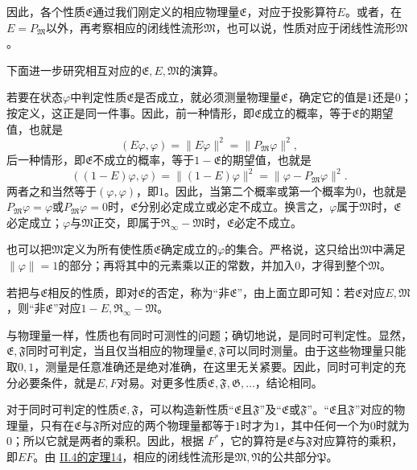 \documentclass[fontsize=13pt,twoside,openany,headings=normal,parskip=false,bookmarkpackage=false,DIV=calc]{scrbook}
\begin{document}
因此，各个性质$\mathfrak E$通过我们刚定义的相应物理量$\mathfrak E$，对应于投影算符$E$。或者，在$E=P_{\mathfrak M}$以外，再考察相应的闭线性流形$\mathfrak M$，也可以说，性质对应于闭线性流形$\mathfrak M$。

下面进一步研究相互对应的$\mathfrak E,\allowbreak E,\allowbreak \mathfrak M$的演算。

若要在状态$\varphi$中判定性质$\mathfrak E$是否成立，就必须测量物理量$\mathfrak E$，确定它的值是$1$还是$0$；按定义，这正是同一件事。因此，前一种情形，即$\mathfrak E$成立的概率，等于$\mathfrak E$的期望值，也就是
\[
(E\varphi,\varphi)=\|E\varphi\|^2=\|P_{\mathfrak M}\varphi\|^2,
\]
后一种情形，即$\mathfrak E$不成立的概率，等于$1-\mathfrak E$的期望值，也就是
\[
((1-E)\varphi,\varphi)=\|(1-E)\varphi\|^2=\|\varphi-P_{\mathfrak M}\varphi\|^2.
\]
两者之和当然等于$(\varphi,\allowbreak \varphi)$，即$1$。因此，当第二个概率或第一个概率为$0$，也就是$P_{\mathfrak M}\varphi=\varphi$或$P_{\mathfrak M}\varphi=0$时，$\mathfrak E$分别必定成立或必定不成立。换言之，$\varphi$属于$\mathfrak M$时，$\mathfrak E$必定成立；$\varphi$与$\mathfrak M$正交，即属于$\mathfrak R_\infty-\mathfrak M$时，$\mathfrak E$必定不成立。

也可以把$\mathfrak M$定义为所有使性质$\mathfrak E$确定成立的$\varphi$的集合。严格说，这只给出$\mathfrak M$中满足$\|\varphi\|=1$的部分；再将其中的元素乘以正的常数，并加入$0$，才得到整个$\mathfrak M$。

若把与$\mathfrak E$相反的性质，即对$\mathfrak E$的否定，称为“非$\mathfrak E$”，由上面立即可知：若$\mathfrak E$对应$E,\allowbreak \mathfrak M$，则“非$\mathfrak E$”对应$1-E,\allowbreak \mathfrak R_\infty-\mathfrak M$。

与物理量一样，性质也有同时可测性的问题；确切地说，是同时可判定性。显然，$\mathfrak E,\allowbreak \mathfrak F$同时可判定，当且仅当相应的物理量$\mathfrak E,\allowbreak \mathfrak F$可以同时测量。由于这些物理量只能取$0,\allowbreak 1$，测量是任意准确还是绝对准确，在这里无关紧要。因此，同时可判定的充分必要条件，就是$E,\allowbreak F$对易。对更多性质$\mathfrak E,\allowbreak \mathfrak F,\allowbreak \mathfrak G,\allowbreak \ldots$，结论相同。

\hypertarget{origpage-133}{}\label{origpage-133}对于同时可判定的性质$\mathfrak E,\allowbreak \mathfrak F$，可以构造新性质“$\mathfrak E$且$\mathfrak F$”及“$\mathfrak E$或$\mathfrak F$”。“$\mathfrak E$且$\mathfrak F$”对应的物理量，只有在$\mathfrak E$与$\mathfrak F$所对应的两个物理量都等于$1$时才为$1$，其中任何一个为$0$时就为$0$；所以它就是两者的乘积。因此，根据 \hyperref[post:III.5.Fstar]{$F^*$}，它的算符是$\mathfrak E$与$\mathfrak F$对应算符的乘积，即$EF$。由 \hyperref[thm:II.14]{II.4的定理14}，相应的闭线性流形是$\mathfrak M,\allowbreak \mathfrak N$的公共部分$\mathfrak P$。
\end{document}
